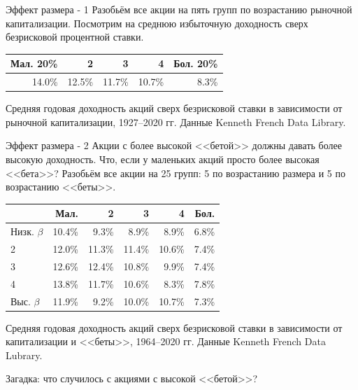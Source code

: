 \documentclass{beamer}
\begin{document}
\begin{frame}{Эффект размера - 1}
\justify
Разобьём все акции на пять групп по возрастанию рыночной капитализации. 
Посмотрим на среднюю избыточную доходность сверх безрисковой процентной ставки.

\justify
\centering
\begin{tabular}{r|r|r|r|r}
Мал. 20\% &      2 &      3 &      4 & Бол. 20\% \\ \hline
   14.0\% & 12.5\% & 11.7\% & 10.7\% &     8.3\%
\end{tabular}

\centering
{\scriptsize Средняя годовая доходность акций сверх безрисковой ставки в
зависимости от рыночной капитализации, 1927--2020 гг. Данные Kenneth French
Data Library.}
\end{frame}



\begin{frame}{Эффект размера - 2}
\justify
Акции с более высокой <<бетой>> должны давать более высокую доходность. Что, 
если у маленьких акций просто более высокая <<бета>>? Разобьём все акции на 25 
групп: 5 по возрастанию размера и 5 по возрастанию <<беты>>.

\justify
\centering
\begin{tabular}{l|r|r|r|r|r}
              &   Мал. &      2 &      3 &     4  & Бол. \\ \hline
Низк. $\beta$ & 10.4\% &  9.3\% &  8.9\% &  8.9\% & 6.8\% \\
2             & 12.0\% & 11.3\% & 11.4\% & 10.6\% & 7.4\% \\
3             & 12.6\% & 12.4\% & 10.8\% &  9.9\% & 7.4\% \\
4             & 13.8\% & 11.7\% & 10.6\% &  8.3\% & 7.8\% \\
Выс. $\beta$  & 11.9\% &  9.2\% & 10.0\% & 10.7\% & 7.3\%
\end{tabular}

\centering
{\scriptsize Средняя годовая доходность акций сверх безрисковой ставки в
зависимости от капитализации и <<беты>>, 1964--2020 гг. Данные Kenneth French 
Data Lubrary.}

\justify
Загадка: что случилось с акциями с высокой <<бетой>>?
\end{frame}
\end{document}
